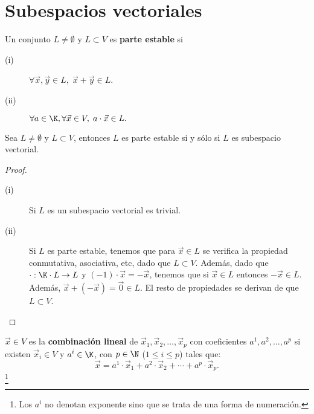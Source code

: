 \section{Subespacios vectoriales}

\begin{fdefinition}
\normalfont Un conjunto $\displaystyle L \neq \emptyset $ y $\displaystyle L \subset V $ es \textbf{parte estable} si 
\begin{description}
\item[(i)] $\displaystyle \forall \vec{x}, \vec{y} \in L, \; \vec{x} + \vec{y} \in L $.
\item[(ii)] $\displaystyle \forall a \in \K, \forall \vec{x} \in V, \; a \cdot \vec{x} \in L. $ 
\end{description}
\end{fdefinition}

\begin{ftheorem}[]
\normalfont Sea $\displaystyle L \neq \emptyset $ y $\displaystyle L \subset V $, entonces $\displaystyle L $  es parte estable si y sólo si $\displaystyle L $ es subespacio vectorial.
\end{ftheorem}

\begin{proof}
\begin{description}
\item[(i)] Si $\displaystyle L $ es un subespacio vectorial es trivial.
\item[(ii)] Si $\displaystyle L $ es parte estable, tenemos que para $\displaystyle \vec{x} \in L $ se verifica la propiedad conmutativa, asociativa, etc, dado que $\displaystyle L \subset V $. Además, dado que $\displaystyle \cdot : \K \cdot L \to L $ y $\displaystyle \left(-1\right) \cdot \vec{x} = - \vec{x} $, tenemos que si $\displaystyle \vec{x} \in L $ entonces $\displaystyle - \vec{x} \in L $. Además, $\displaystyle \vec{x} + \left(- \vec{x}\right) = \vec{0} \in L $. El resto de propiedades se derivan de que $\displaystyle L \subset V $.
\end{description}
\end{proof}

\begin{fdefinition}
\normalfont $\displaystyle \vec{x} \in V $ es la \textbf{combinación lineal} de $\displaystyle \vec{x}_{1}, \vec{x}_{2}, \ldots, \vec{x}_{p} $ con coeficientes $\displaystyle a^{1}, a^{2}, \ldots, a^{p} $ si existen $\displaystyle \vec{x}_{i} \in V $ y $\displaystyle a ^{i} \in \K $, con $\displaystyle p \in \N $ ($\displaystyle 1 \leq i \leq p $) tales que:
\[\vec{x} = a^{1} \cdot \vec{x}_{1} + a^{2} \cdot \vec{x}_{2} + \cdots + a ^{p} \cdot \vec{x}_{p} .\]
\footnote{Los $\displaystyle a^{i} $ no denotan exponente sino que se trata de una forma de numeración.} 
\end{fdefinition}

